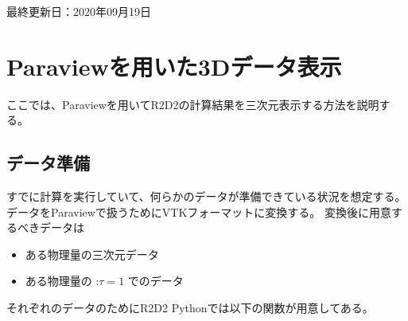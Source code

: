 \documentclass[letterpaper,10pt,dvipdfmx,report]{sphinxmanual}
\begin{document}
最終更新日：2020年09月19日


\chapter{Paraviewを用いた3Dデータ表示}
\label{\detokenize{paraview:paraview3d}}\label{\detokenize{paraview::doc}}
ここでは、Paraviewを用いてR2D2の計算結果を三次元表示する方法を説明する。


\section{データ準備}
\label{\detokenize{paraview:id1}}
すでに計算を実行していて、何らかのデータが準備できている状況を想定する。
データをParaviewで扱うためにVTKフォーマットに変換する。
変換後に用意するべきデータは
\begin{itemize}
\item {} 
ある物理量の三次元データ

\item {} 
ある物理量の :\(\tau=1\) でのデータ

\end{itemize}

それぞれのデータのためにR2D2 Pythonでは以下の関数が用意してある。
\end{document}
